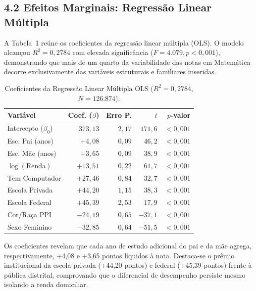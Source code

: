 \documentclass[twocolumn,10pt,a4paper]{article}
\begin{document}
\subsection*{4.2 Efeitos Marginais: Regressão Linear Múltipla}

A Tabela~1 reúne os coeficientes da regressão linear múltipla (OLS). O modelo alcançou $R^2 = 0{,}2784$ com elevada significância ($F = 4.079, p < 0{,}001$), demonstrando que mais de um quarto da variabilidade das notas em Matemática decorre exclusivamente das variáveis estruturais e familiares inseridas.

\begin{table}[htbp]
  \centering
  \footnotesize
  \caption{Coeficientes da Regressão Linear Múltipla OLS ($R^2 = 0{,}2784$, $N = 126.874$).}
  \begin{tabular}{l rrrr}
    \toprule
    \textbf{Variável} & \textbf{Coef. ($\beta$)} & \textbf{Erro P.} & \textbf{$t$} & \textbf{$p$-valor} \\
    \midrule
    Intercepto ($\beta_0$)   & $373{,}13$ & $2{,}17$ & $171{,}6$ & $< 0{,}001$ \\
    Esc. Pai (anos)          & $+4{,}08$  & $0{,}09$ & $46{,}2$  & $< 0{,}001$ \\
    Esc. Mãe (anos)          & $+3{,}65$  & $0{,}09$ & $38{,}9$  & $< 0{,}001$ \\
    $\log(\text{Renda})$     & $+13{,}51$ & $0{,}22$ & $61{,}7$  & $< 0{,}001$ \\
    Tem Computador           & $+27{,}46$ & $0{,}84$ & $32{,}7$  & $< 0{,}001$ \\
    Escola Privada           & $+44{,}20$ & $1{,}15$ & $38{,}3$  & $< 0{,}001$ \\
    Escola Federal           & $+45{,}39$ & $2{,}53$ & $17{,}9$  & $< 0{,}001$ \\
    Cor/Raça PPI             & $-24{,}19$ & $0{,}65$ & $-37{,}1$ & $< 0{,}001$ \\
    Sexo Feminino            & $-32{,}85$ & $0{,}64$ & $-51{,}5$ & $< 0{,}001$ \\
    \bottomrule
  \end{tabular}
\end{table}

Os coeficientes revelam que cada ano de estudo adicional do pai e da mãe agrega, respectivamente, +4,08 e +3,65 pontos líquidos à nota. Destaca-se o prêmio institucional da escola privada (+44,20 pontos) e federal (+45,39 pontos) frente à pública distrital, comprovando que o diferencial de desempenho persiste mesmo isolando a renda domiciliar.
\end{document}
